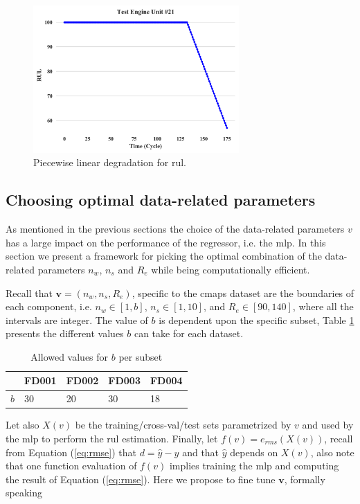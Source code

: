 \begin{figure}[!htb]
\centering
\includegraphics[width=0.7\textwidth]{../img/test_engine.png}
\caption{Piecewise linear degradation for \gls{rul}.}
\label{fig:piecewise_model}
\end{figure}

\subsection{Choosing optimal data-related parameters}
\label{sec:choosing_otimal_data-related_params}

As mentioned in the previous sections the choice of the data-related parameters $v$ has a large impact on the performance of the regressor, i.e. the \gls{mlp}. In this section we present a framework for picking the optimal combination of the data-related parameters $n_w$, $n_s$ and $R_e$ while being computationally efficient.

Recall that $\mathbf{v} = (n_w, n_s, R_e)$, specific to the \gls{cmaps} dataset are the boundaries of each component, i.e. $n_w \in \left[1, b\right]$, $n_s \in \left[1, 10\right]$, and $R_e \in \left[90, 140 \right]$, where all the intervals are integer. The value of $b$ is dependent upon the specific subset, Table \ref{table:b_values} presents the different values $b$ can take for each dataset.

\begin{table}[!htb]
\centering
\begin{tabular}{l | l l l l}
	\hline
	 & FD001 & FD002 & FD003 & FD004\\
  	\hline
  	$b$ & 30 & 20 & 30 & 18\\
  	\hline
\end{tabular}
\caption{Allowed values for $b$ per subset}
\label{table:b_values}
\end{table}

Let also $X(v)$ be the training/cross-val/test sets parametrized by $v$ and used by the \gls{mlp} to perform the \gls{rul} estimation. Finally, let $f(v)=e_{rms}(X(v))$, recall from Equation (\ref{eq:rmse}) that $d = \hat{y} - y$ and that $\hat{y}$ depends on $X(v)$, also note that one function evaluation of $f(v)$ implies training the \gls{mlp} and computing the result of Equation (\ref{eq:rmse}). Here we propose to fine tune $\mathbf{v}$, formally speaking


